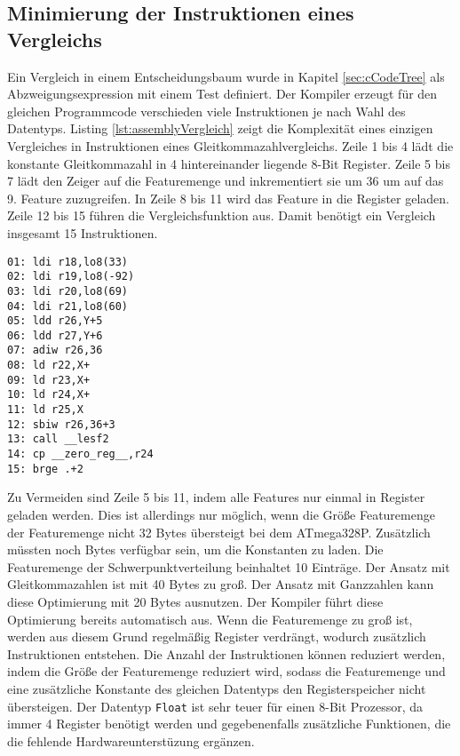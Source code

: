 \subsection{Minimierung der Instruktionen eines Vergleichs}
Ein Vergleich in einem Entscheidungsbaum wurde in Kapitel \ref{sec:cCodeTree} als Abzweigungsexpression mit einem Test definiert. Der Kompiler erzeugt für den gleichen Programmcode verschieden viele Instruktionen
je nach Wahl des Datentyps.
\newline
\newline
Listing \ref{lst:assemblyVergleich} zeigt die Komplexität eines einzigen Vergleiches in Instruktionen eines Gleitkommazahlvergleichs. Zeile 1 bis 4 lädt die konstante Gleitkommazahl in 4 hintereinander liegende
8-Bit Register. Zeile 5 bis 7 lädt den Zeiger auf die Featuremenge und inkrementiert sie um 36 um auf das 9. Feature zuzugreifen. In Zeile 8 bis 11 wird das Feature in die Register geladen. Zeile 12 bis 15 führen die
Vergleichsfunktion aus. Damit benötigt ein Vergleich insgesamt 15 Instruktionen.
\begin{lstlisting}[label=lst:assemblyVergleich,caption={Vergleich von Feature als Gleitkommazahl mit konstanter Gleitkommazahl.}]
01: ldi r18,lo8(33)
02: ldi r19,lo8(-92)
03: ldi r20,lo8(69)
04: ldi r21,lo8(60)
05: ldd r26,Y+5
06: ldd r27,Y+6
07: adiw r26,36
08: ld r22,X+
09: ld r23,X+
10: ld r24,X+
11: ld r25,X
12: sbiw r26,36+3
13: call __lesf2
14: cp __zero_reg__,r24
15: brge .+2
\end{lstlisting}
Zu Vermeiden sind Zeile 5 bis 11, indem alle Features nur einmal in Register geladen werden. Dies ist allerdings nur möglich, wenn die Größe Featuremenge der Featuremenge nicht 32 Bytes übersteigt bei dem
ATmega328P. Zusätzlich müssten noch Bytes verfügbar sein, um die Konstanten zu laden. Die Featuremenge der Schwerpunktverteilung beinhaltet 10 Einträge. Der Ansatz mit Gleitkommazahlen ist mit 40 Bytes zu groß.
Der Ansatz mit Ganzzahlen kann diese Optimierung mit 20 Bytes ausnutzen. Der Kompiler führt diese Optimierung bereits automatisch aus. Wenn die Featuremenge zu groß ist, werden aus diesem Grund regelmäßig
Register verdrängt, wodurch zusätzlich Instruktionen entstehen. Die Anzahl der Instruktionen können reduziert werden, indem die Größe der Featuremenge reduziert wird, sodass die Featuremenge und eine
zusätzliche Konstante des gleichen Datentyps den Registerspeicher nicht übersteigen.
\newline
\newline
Der Datentyp \texttt{Float} ist sehr teuer für einen 8-Bit Prozessor, da immer 4 Register benötigt werden und gegebenenfalls zusätzliche Funktionen, die die fehlende Hardwareunterstüzung ergänzen.
